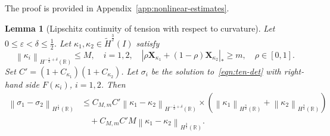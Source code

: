 \documentclass[11pt,reqno]{amsart}
\theoremstyle{plain}
\newtheorem{lemma}[theorem]{Lemma}
\theoremstyle{definition}
\numberwithin{equation}{section}
\newcommand{\paren}[1]{\left(#1\right)}
\newcommand{\wt}[1]{\widetilde{#1}}
\newcommand{\bm}[1]{\boldsymbol{#1}}
\newcommand{\abs}[1]{\left\lvert #1 \right\rvert}
\newcommand{\norm}[1]{\left\lVert #1 \right\rVert}
\newcommand{\R}{\mathbb{R}}
\newcommand{\xka}[1]{\bm X_{\kappa_{#1}}}
\newcommand{\thi}[1]{\wt H^{#1}(I)}
\newcommand{\hr}[1]{H^{#1}(\R)}
\begin{document}
The proof is provided in Appendix~\ref{app:nonlinear-estimates}.

\begin{lemma}[Lipschitz continuity of tension with respect to curvature]\label{sigma-Lip-F}
Let $0\le \varepsilon<\delta\le \frac{1}{2}$.
Let $\kappa_1,\kappa_2 \in \thi{\frac{3}{2}}$ satisfy
\begin{equation*}
    \norm{\kappa_i}_{\hr{-\frac{1}{2}+\delta}}\le M,
    \quad i=1,2,
    \quad
    \abs{\rho \xka{1} + \paren{1-\rho}\xka{2}}_*\ge m,
    \quad \rho\in[0,1].
\end{equation*}
Set $C'=(1+C_{\kappa_1})(1+C_{\kappa_2})$.
Let $\sigma_i$ be the solution to~\eqref{eqn:ten-det} with right-hand side
$F(\kappa_i)$, $i=1,2$.
Then
\begin{equation}\label{eqn:tension-difference}
\begin{aligned}
    \norm{\sigma_1 - \sigma_2}_{\hr{\frac{1}{2}}} &\le C_{M,m}C'
    \norm{\kappa_1-\kappa_2}_{\hr{-\frac{1}{2}+\delta}} \times \paren{ \norm{\kappa_1}_{\hr{\frac{3}{2}}}
    +\norm{\kappa_2}_{\hr{\frac{3}{2}}} } \\
    &\quad+ C_{M,m}C'M \norm{\kappa_1-\kappa_2}_{\hr{\frac{3}{2}}}.
\end{aligned}
\end{equation}
\end{lemma}
\end{document}
